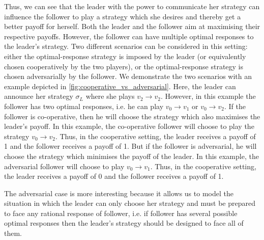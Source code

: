 Thus, we can see that the leader with the power to communicate her strategy can influence the follower to play a strategy which she desires and thereby get a better payoff for herself. Both the leader and the follower aim at maximising their respective payoffs. However, the follower can have multiple optimal responses to the leader's strategy. Two different scenarios can be considered in this setting: either the optimal-response strategy is imposed by the leader (or equivalently chosen cooperatively by the two players), or the optimal-response strategy is chosen adversarially by the follower. We demonstrate the two scenarios with an example depicted in \cref{fig:cooperative_vs_adversarial}. Here, the leader can announce her strategy $\sigma_L$ where she plays $v_2 \to v_2$. However, in this example the follower has two optimal responses, i.e. he can play $v_0 \to v_1$ or $v_0 \to v_2$. If the follower is co-operative, then he will choose the strategy which also maximises the leader's payoff. In this example, the co-operative follower will choose to play the strategy $v_0 \to v_2$. Thus, in the cooperative setting, the leader receives a payoff of 1 and the follower receives a payoff of 1. But if the follower is adversarial, he will choose the strategy which minimises the payoff of the leader. In this example, the adversarial follower will choose to play $v_0 \to v_1$. Thus, in the cooperative setting, the leader receives a payoff of 0 and the follower receives a payoff of 1.

The adversarial case is more interesting because it allows us to model the situation in which the leader can only choose her strategy and must be prepared to face any rational response of follower, i.e. if follower has several possible optimal responses then the leader's strategy should be designed to face all of them.

